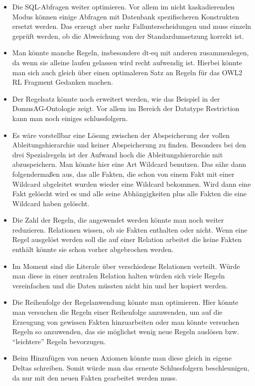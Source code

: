 \begin{itemize}
  \item Die SQL-Abfragen weiter optimieren. Vor allem im nicht kaskadierenden Modus können einige Abfragen mit Datenbank spezifischeren Konstrukten ersetzt werden. Das erzeugt aber mehr Fallunterscheidungen und muss einzeln geprüft werden, ob die Abweichung von der Standardumsetzung korrekt ist.
  \item Man könnte manche Regeln, insbesondere dt-eq mit anderen zusammenlegen, da wenn sie alleine laufen gelassen wird recht aufwendig ist. Hierbei könnte man sich auch gleich über einen optimaleren Satz an Regeln für das OWL2 RL Fragment Gedanken machen.
  \item Der Regelsatz könnte noch erweitert werden, wie das Beispiel in der DomusAG-Ontologie zeigt. Vor allem im Bereich der Datatype Restriction kann man noch einiges schlussfolgern.
  \item Es wäre vorstellbar eine Lösung zwischen der Abspeicherung der vollen Ableitungshierarchie und keiner Abspeicherung zu finden. Besonders bei den drei Spezialregeln ist der Aufwand hoch die Ableitungshierarchie mit abzuspeichern. Man könnte hier eine Art Wildcard benutzen. Das sähe dann folgendermaßen aus, das alle Fakten, die schon von einem Fakt mit einer Wildcard abgeleitet wurden wieder eine Wildcard bekommen. Wird dann eine Fakt gelöscht wird es und alle seine Abhängigkeiten plus alle Fakten die eine Wildcard haben gelöscht.
  \item Die Zahl der Regeln, die angewendet werden könnte man noch weiter reduzieren. Relationen wissen, ob sie Fakten enthalten oder nicht. Wenn eine Regel ausgelöst werden soll die auf einer Relation arbeitet die keine Fakten enthält könnte sie schon vorher abgebrochen werden.
  \item Im Moment sind die Literale über verschiedene Relationen verteilt. Würde man diese in einer zentralen Relation halten würden sich viele Regeln vereinfachen und die Daten müssten nicht hin und her kopiert werden.
  \item Die Reihenfolge der Regelanwendung könnte man optimieren. Hier könnte man versuchen die Regeln einer Reihenfolge anzuwenden, um auf die Erzeugung von gewissen Fakten hinzuarbeiten oder man könnte versuchen Regeln so anzuwenden, das sie möglichst wenig neue Regeln auslösen bzw. ``leichtere'' Regeln bevorzugen.
  \item Beim Hinzufügen von neuen Axiomen könnte man diese gleich in eigene Deltas schreiben. Somit würde man das erneute Schlussfolgern beschleunigen, da nur mit den neuen Fakten gearbeitet werden muss.

\end{itemize}
